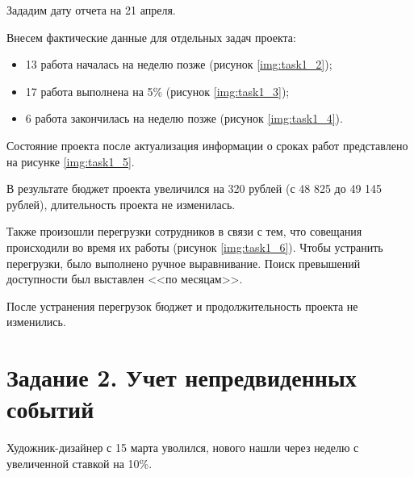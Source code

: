 \documentclass{bmstu}
\begin{document}
Зададим дату отчета на 21 апреля.


Внесем фактические данные для отдельных задач проекта:

\begin{itemize}
    \item 13 работа началась на неделю позже (рисунок \ref{img:task1_2});
    \item 17 работа выполнена на 5\% (рисунок \ref{img:task1_3});
    \item 6 работа закончилась на неделю позже (рисунок \ref{img:task1_4}).
\end{itemize}

Состояние проекта после актуализация информации о сроках работ представлено на рисунке \ref{img:task1_5}.


\clearpage




\clearpage

В результате бюджет проекта увеличился на 320 рублей (с 48 825 до 49 145 рублей), длительность проекта не изменилась. 

Также произошли перегрузки сотрудников в связи с тем, что совещания происходили во время их работы (рисунок \ref{img:task1_6}). Чтобы устранить перегрузки, было выполнено ручное выравнивание. Поиск превышений доступности был выставлен <<по месяцам>>.


После устранения перегрузок бюджет и продолжительность проекта не изменились.

\section*{Задание 2. Учет непредвиденных событий}

Художник-дизайнер с 15 марта уволился, нового нашли через неделю с увеличенной ставкой на 10\%.


\clearpage
\end{document}
